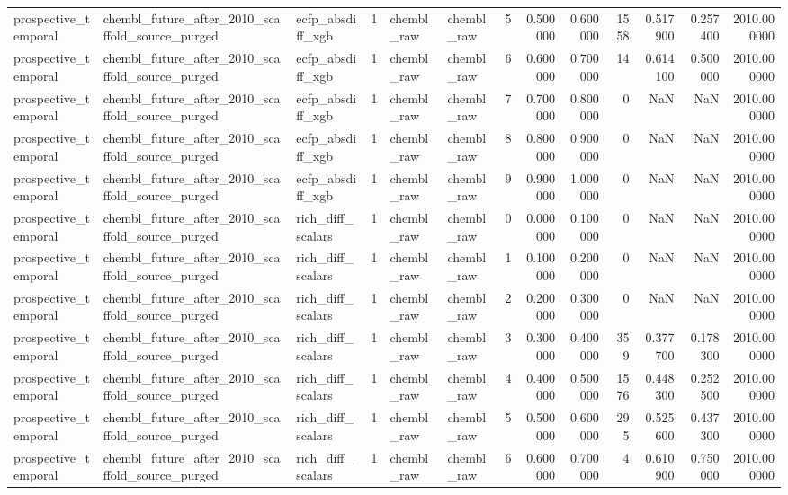 \begin{longtable}{lllrllrrrrrrr}
prospective\_temporal & chembl\_future\_after\_2010\_scaffold\_source\_purged & ecfp\_absdiff\_xgb & 1 & chembl\_raw & chembl\_raw & 5 & 0.500000 & 0.600000 & 1558 & 0.517900 & 0.257400 & 2010.000000 \\
prospective\_temporal & chembl\_future\_after\_2010\_scaffold\_source\_purged & ecfp\_absdiff\_xgb & 1 & chembl\_raw & chembl\_raw & 6 & 0.600000 & 0.700000 & 14 & 0.614100 & 0.500000 & 2010.000000 \\
prospective\_temporal & chembl\_future\_after\_2010\_scaffold\_source\_purged & ecfp\_absdiff\_xgb & 1 & chembl\_raw & chembl\_raw & 7 & 0.700000 & 0.800000 & 0 & NaN & NaN & 2010.000000 \\
prospective\_temporal & chembl\_future\_after\_2010\_scaffold\_source\_purged & ecfp\_absdiff\_xgb & 1 & chembl\_raw & chembl\_raw & 8 & 0.800000 & 0.900000 & 0 & NaN & NaN & 2010.000000 \\
prospective\_temporal & chembl\_future\_after\_2010\_scaffold\_source\_purged & ecfp\_absdiff\_xgb & 1 & chembl\_raw & chembl\_raw & 9 & 0.900000 & 1.000000 & 0 & NaN & NaN & 2010.000000 \\
prospective\_temporal & chembl\_future\_after\_2010\_scaffold\_source\_purged & rich\_diff\_scalars & 1 & chembl\_raw & chembl\_raw & 0 & 0.000000 & 0.100000 & 0 & NaN & NaN & 2010.000000 \\
prospective\_temporal & chembl\_future\_after\_2010\_scaffold\_source\_purged & rich\_diff\_scalars & 1 & chembl\_raw & chembl\_raw & 1 & 0.100000 & 0.200000 & 0 & NaN & NaN & 2010.000000 \\
prospective\_temporal & chembl\_future\_after\_2010\_scaffold\_source\_purged & rich\_diff\_scalars & 1 & chembl\_raw & chembl\_raw & 2 & 0.200000 & 0.300000 & 0 & NaN & NaN & 2010.000000 \\
prospective\_temporal & chembl\_future\_after\_2010\_scaffold\_source\_purged & rich\_diff\_scalars & 1 & chembl\_raw & chembl\_raw & 3 & 0.300000 & 0.400000 & 359 & 0.377700 & 0.178300 & 2010.000000 \\
prospective\_temporal & chembl\_future\_after\_2010\_scaffold\_source\_purged & rich\_diff\_scalars & 1 & chembl\_raw & chembl\_raw & 4 & 0.400000 & 0.500000 & 1576 & 0.448300 & 0.252500 & 2010.000000 \\
prospective\_temporal & chembl\_future\_after\_2010\_scaffold\_source\_purged & rich\_diff\_scalars & 1 & chembl\_raw & chembl\_raw & 5 & 0.500000 & 0.600000 & 295 & 0.525600 & 0.437300 & 2010.000000 \\
prospective\_temporal & chembl\_future\_after\_2010\_scaffold\_source\_purged & rich\_diff\_scalars & 1 & chembl\_raw & chembl\_raw & 6 & 0.600000 & 0.700000 & 4 & 0.610900 & 0.750000 & 2010.000000 \\

\end{longtable}
